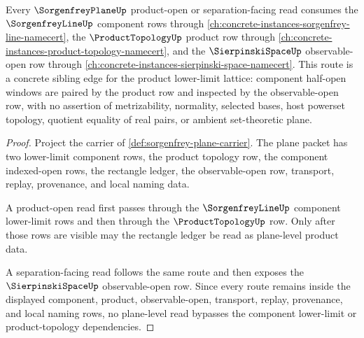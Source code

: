 \begin{theorem}
\label{thm:sorgenfrey-plane-product-topology-forward-link}
Every $\SorgenfreyPlaneUp$ product-open or separation-facing read consumes the $\SorgenfreyLineUp$ component rows through \autoref{ch:concrete-instances-sorgenfrey-line-namecert}, the $\ProductTopologyUp$ product row through \autoref{ch:concrete-instances-product-topology-namecert}, and the $\SierpinskiSpaceUp$ observable-open row through \autoref{ch:concrete-instances-sierpinski-space-namecert}. This route is a concrete sibling edge for the product lower-limit lattice: component half-open windows are paired by the product row and inspected by the observable-open row, with no assertion of metrizability, normality, selected bases, host powerset topology, quotient equality of real pairs, or ambient set-theoretic plane.
\end{theorem}
\begin{proof}
Project the carrier of \autoref{def:sorgenfrey-plane-carrier}. The plane packet has two lower-limit component rows, the product topology row, the component indexed-open rows, the rectangle ledger, the observable-open row, transport, replay, provenance, and local naming data.

A product-open read first passes through the $\SorgenfreyLineUp$ component lower-limit rows and then through the $\ProductTopologyUp$ row. Only after those rows are visible may the rectangle ledger be read as plane-level product data.

A separation-facing read follows the same route and then exposes the $\SierpinskiSpaceUp$ observable-open row. Since every route remains inside the displayed component, product, observable-open, transport, replay, provenance, and local naming rows, no plane-level read bypasses the component lower-limit or product-topology dependencies.
\end{proof}
